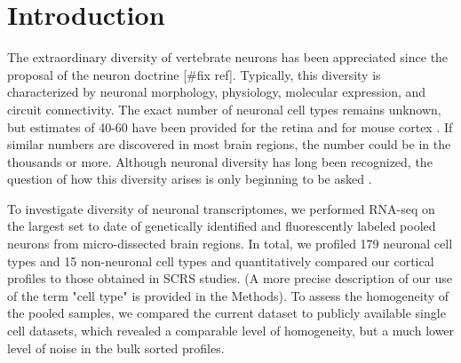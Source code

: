 \section*{Introduction}

The extraordinary diversity of vertebrate neurons has been appreciated since the proposal of the neuron doctrine \citep{Cajal_1888} [#fix ref]. Typically, this diversity is characterized by neuronal morphology, physiology, molecular expression, and circuit connectivity. The exact number of neuronal cell types remains unknown, but estimates of 40-60 have been provided for the retina \citep{Macosko_2015,Masland_2004} and for mouse cortex \citep{Tasic_2016,Zeisel_2015}. If similar numbers are discovered in most brain regions, the number could be in the thousands or more. Although neuronal diversity has long been recognized, the question of how this  diversity arises is only beginning to be asked \citep{Arendt_2008,Muotri_2006}. 


To investigate diversity of neuronal transcriptomes, we performed RNA-seq on the largest set to date of genetically identified and fluorescently labeled pooled neurons from micro-dissected brain regions. In total, we profiled 179 neuronal cell types and 15 non-neuronal cell types and quantitatively compared our cortical profiles to those obtained in SCRS studies. (A more precise description of our use of the term "cell type" is provided in the Methods). To assess the homogeneity of the pooled samples, we compared the current dataset to publicly available single cell datasets, which revealed a comparable level of homogeneity, but a much lower level of noise in the bulk sorted profiles. 

